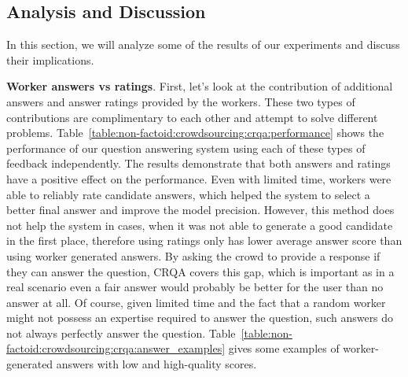 \subsection{Analysis and Discussion}
\label{section:non-factoid:crowdsourcing:analysis}

In this section, we will analyze some of the results of our experiments and discuss their implications.

\textbf{Worker answers vs ratings}.
First, let's look at the contribution of additional answers and answer ratings provided by the workers.
These two types of contributions are complimentary to each other and attempt to solve different problems.
Table~\ref{table:non-factoid:crowdsourcing:crqa:performance} shows the performance of our question answering system using each of these types of feedback independently.
The results demonstrate that both answers and ratings have a positive effect on the performance.
Even with limited time, workers were able to reliably rate candidate answers, which helped the system to select a better final answer and improve the model precision.
However, this method does not help the system in cases, when it was not able to generate a good candidate in the first place, therefore using ratings only has lower average answer score than using worker generated answers.
By asking the crowd to provide a response if they can answer the question, CRQA covers this gap, which is important as in a real scenario even a fair answer would probably be better for the user than no answer at all.
Of course, given limited time and the fact that a random worker might not possess an expertise required to answer the question, such answers do not always perfectly answer the question.
Table~\ref{table:non-factoid:crowdsourcing:crqa:answer_examples} gives some examples of worker-generated answers with low and high-quality scores.


